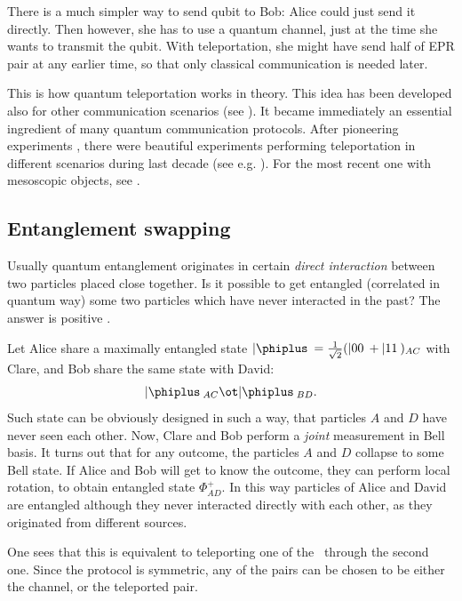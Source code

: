 \documentclass[twocolumn,aps,rmp]{revtex4}
\begin{document}
There is a much simpler way to send qubit to Bob: Alice could just
send it directly. Then however, she has to use a quantum channel, just
at the time she wants to transmit the qubit. With teleportation, she
might have send half of EPR pair at any earlier time, so that only
classical communication is needed later.

This is how quantum teleportation works in theory. This idea has been
developed also for other communication scenarios (see
\cite{DurCirac-telep}). It became immediately an essential ingredient
of many quantum communication protocols. After pioneering experiments
\cite{Rzym-teleportation,Wieden-teleportation, Kimble-teleportation},
there were beautiful experiments performing teleportation in different
scenarios during last decade (see
e.g. \cite{13,Riebe-telep2004,Nielsen-telep1998,Barrett-telep2004,Ursin-telep2004}).
For the most recent one with mesoscopic objects, see
\cite{Polzik2006-foton-atom}.



\subsection{Entanglement swapping}
\label{subsec:Swapping}

Usually quantum entanglement originates in certain {\it direct
  interaction} between two particles placed close together. Is it
possible to get entangled (correlated in quantum way) some two
particles which have never interacted in the past? The answer is
positive \cite{YurkeStoller_ent_swapping,Teleportation,ent_swapping}.

Let Alice share a maximally entangled state $|\phiplus\> = {1\over
  {\sqrt 2}}(|00\> + |11\>)_{AC}$ with Clare, and Bob share the same state
with David:
\begin{equation}
|\phiplus\>_{AC}\ot|\phiplus\>_{BD}.
\end{equation}
Such state can be obviously designed in such a way, that particles $A$
and $D$ have never seen each other. Now, Clare and Bob perform a {\it
  joint} measurement in Bell basis. It turns out that for any outcome,
the particles $A$ and $D$ collapse to some Bell state. If Alice and
Bob will get to know the outcome, they can perform local rotation, to
obtain entangled state $\Phi^+_{AD}$.  In this way particles of Alice
and David are entangled although they never interacted directly with
each other, as they originated from different sources.

One sees that this is equivalent to teleporting one of the \eprpair\
through the second one. Since the protocol is symmetric, any of the
pairs can be chosen to be either the channel, or the teleported pair.
\end{document}
